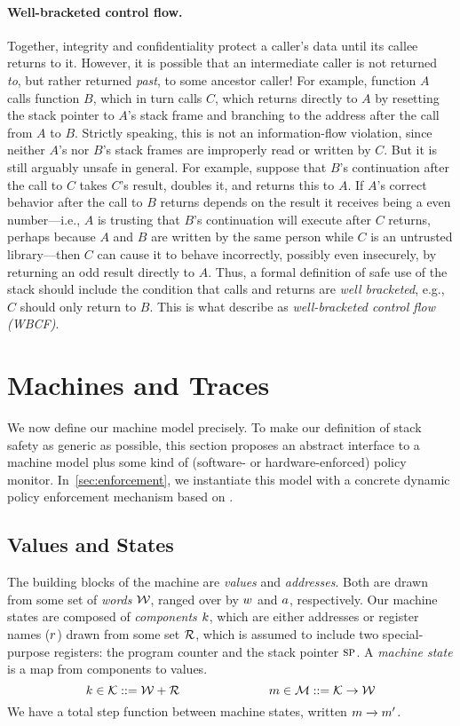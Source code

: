 \documentclass[acmsmall,review,anonymous]{acmart}\settopmatter{printfolios=true,printccs=false,printacmref=false}
\begin{document}
\paragraph{Well-bracketed control flow.} Together,
integrity and confidentiality protect a caller's data until its callee
returns to it. However, it is possible that an intermediate caller is not
returned {\em to}, but rather returned {\em past}, to some ancestor caller!
For example, function $A$ calls function $B$, which in turn calls $C$, which
returns directly to $A$ by resetting the stack pointer to $A$'s stack frame
and branching to the address after the call from $A$ to $B$.  Strictly
speaking, this is not an information-flow violation, since neither $A$'s nor
$B$'s stack frames are improperly read or written by $C$.  But it is still
arguably unsafe in general.  For example, suppose that $B$'s continuation
after the call to $C$ takes $C$'s result, doubles it, and returns this to
$A$.  If $A$'s correct behavior after the call to $B$ returns depends on the
result it receives being a even number---i.e., $A$ is trusting that $B$'s
continuation will execute after $C$ returns, perhaps because $A$ and $B$ are
written by the same person while $C$ is an untrusted library---then $C$ can
cause it to behave incorrectly, possibly even insecurely, by returning an
odd result directly to $A$.
%
Thus, a formal definition of safe use of the stack should include the
condition that calls and returns are {\em well bracketed}, e.g., $C$ should
only return to $B$.  This is what \citet{SkorstengaardSTK} describe
as \emph{well-bracketed control flow (WBCF)}.

\section{Machines and Traces}
\label{sec:prelim}

We now define our machine model precisely. To make our definition of stack safety
as generic as possible, this section proposes an abstract interface to a
machine model plus some kind of (software- or hardware-enforced) policy monitor.
In~\cref{sec:enforcement}, we instantiate this model with a concrete dynamic
policy enforcement mechanism based on \citet{DBLP:conf/sp/RoesslerD18}.

\subsection{Values and States}

The building blocks of the machine are {\em values} and {\em addresses}.
Both are drawn from some set of {\em words} \({\mathcal W}\), ranged over by \(w\) and
\(a\), respectively.
%
Our machine states are composed of {\em components} \(k\),
which are either addresses or register names (\(r\)) drawn from some set
\({\mathcal R}\), which is assumed to include two special-purpose registers: the
program counter {\PCname} and the stack pointer \(\textsc{sp}\).
A {\em machine state} is a map from components to values.
%
    \[k \in {\mathcal K} ::= {\mathcal W} + {\mathcal R}  \hspace{1in}
    m \in {\mathcal M} ::= {\mathcal K} \rightarrow {\mathcal W}\]
%
We have a total step function between machine states, written \(m \xrightarrow{} m'\).
\end{document}

